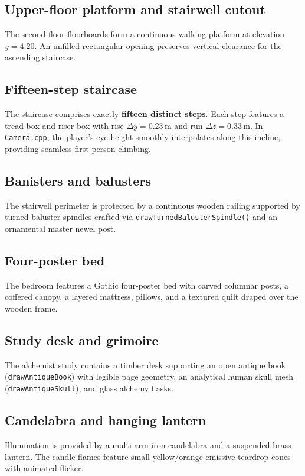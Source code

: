 \documentclass[10pt,a4paper,oneside]{article}
\begin{document}
\subsection{Upper-floor platform and stairwell cutout}
The second-floor floorboards form a continuous walking platform at elevation $y = 4.20$. An unfilled rectangular opening preserves vertical clearance for the ascending staircase.

\subsection{Fifteen-step staircase}
The staircase comprises exactly \textbf{fifteen distinct steps}. Each step features a tread box and riser box with rise $\Delta y = 0.23\,\mathrm{m}$ and run $\Delta z = 0.33\,\mathrm{m}$. In \texttt{Camera.cpp}, the player's eye height smoothly interpolates along this incline, providing seamless first-person climbing.

\subsection{Banisters and balusters}
The stairwell perimeter is protected by a continuous wooden railing supported by turned baluster spindles crafted via \texttt{drawTurnedBalusterSpindle()} and an ornamental master newel post.

\subsection{Four-poster bed}
The bedroom features a Gothic four-poster bed with carved columnar posts, a coffered canopy, a layered mattress, pillows, and a textured quilt draped over the wooden frame.

\subsection{Study desk and grimoire}
The alchemist study contains a timber desk supporting an open antique book (\texttt{drawAntiqueBook}) with legible page geometry, an analytical human skull mesh (\texttt{drawAntiqueSkull}), and glass alchemy flasks.

\subsection{Candelabra and hanging lantern}
Illumination is provided by a multi-arm iron candelabra and a suspended brass lantern. The candle flames feature small yellow/orange emissive teardrop cones with animated flicker.
\end{document}
